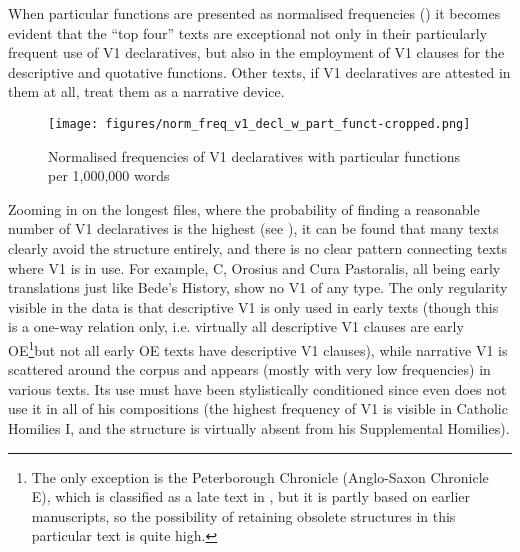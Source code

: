 \documentclass[output=paper,colorlinks,citecolor=brown]{langscibook}
\begin{document}
\largerpage
When particular functions are presented as normalised frequencies () it becomes evident that the “top four” texts are exceptional not only in their particularly frequent use of V1 declaratives, but also in the employment of V1 clauses for the descriptive and quotative functions. Other texts, if V1 declaratives are attested in them at all, treat them as a narrative device.

\begin{figure}
    \centering
    \texttt{[image: figures/norm\_freq\_v1\_decl\_w\_part\_funct-cropped.png]}
    \caption{Normalised frequencies of V1 declaratives with particular functions per 1,000,000 words}
\label{fig:cichosz:2}
\end{figure}

Zooming in on the longest  files, where the probability of finding a reasonable number of V1 declaratives is the highest (see ), it can be found that many texts clearly avoid the structure entirely, and there is no clear pattern connecting texts where V1 is in use. For example,  C, Orosius and Cura Pastoralis, all being early translations just like Bede's History, show no V1 of any type. The only regularity visible in the data is that descriptive V1 is only used in early texts (though this is a one-way relation only, i.e. virtually all descriptive V1 clauses are early OE\footnote{The only exception is the Peterborough Chronicle (Anglo-Saxon Chronicle E), which is classified as a late text in , but it is partly based on earlier manuscripts, so the possibility of retaining obsolete structures in this particular text is quite high.}but not all early OE texts have descriptive V1 clauses), while narrative V1 is scattered around the corpus and appears (mostly with very low frequencies) in various texts. Its use must have been stylistically conditioned since even  does not use it in all of his compositions (the highest frequency of V1 is visible in Catholic Homilies I, and the structure is virtually absent from his Supplemental Homilies).
\end{document}
